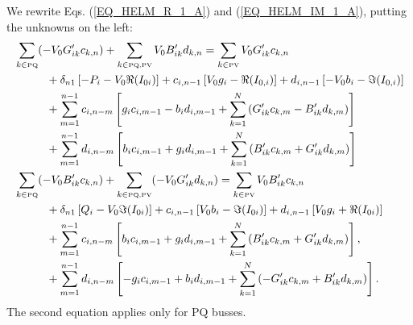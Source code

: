 \documentclass[11pt]{article}
\begin{document}
We rewrite Eqs. (\ref{EQ_HELM_R_1_A}) and (\ref{EQ_HELM_IM_1_A}), putting the unknowns on the left:
\begin{align}
	 &\sum_{k\in\text{\tiny PQ}}(-V_0G'_{ik}c_{k,n}) + \sum_{k\in\text{\tiny PQ,PV}}V_0B'_{ik}d_{k,n} =\sum_{k\in\text{\tiny PV}} V_0G'_{ik}c_{k,n} \notag \\
		&\hspace{1cm}+ \delta_{n1} \left[-P_i - V_0\Re(I_{0i})\right] + c_{i,n-1}\left[V_0g_i - \Re(I_{0,i})\right]+d_{i,n-1}\left[- V_0b_i  - \Im(I_{0,i})\right] \notag \\
		&\hspace{1cm}+ \sum_{m=1}^{n-1}{
			c_{i,n-m}
			\left[
				g_ic_{i,m-1} - b_id_{i,m-1}+ \sum_{k=1}^N\left(G'_{ik}c_{k,m} - B'_{ik}d_{k,m}\right) 
			\right]
		} \notag \\
		&\hspace{1cm}+ \sum_{m=1}^{n-1}{
			d_{i,n-m}
			\left[
				b_ic_{i,m-1} + g_id_{i,m-1} + \sum_{k=1}^N\left(B'_{ik}c_{k,m} + G'_{ik}d_{k,m}\right) 
			\right]
		}
		\label{EQ_HELM_R_1} \\
	 &\sum_{k\in\text{\tiny PQ}}(-V_0B'_{ik}c_{k,n}) + \sum_{k\in\text{\tiny PQ,PV}}(-V_0G'_{ik}d_{k,n}) = \sum_{k\in\text{\tiny PV}}V_0B'_{ik}c_{k,n} \notag \\
		&\hspace{1cm}+\delta_{n1}\left[Q_i - V_0\Im(I_{0i})\right] + c_{i,n-1}\left[V_0 b_i-\Im(I_{0i})\right] + d_{i,n-1}\left[V_0g_i  + \Re(I_{0i})\right]\notag \\
		&\hspace{1cm}+ \sum_{m=1}^{n-1}{
			c_{i,n-m} \left[
				b_ic_{i,m-1} + g_id_{i,m-1}  + \sum_{k=1}^N\left(B'_{ik}c_{k,m} + G'_{ik}d_{k,m}\right) 
			\right],
		} \notag \\
		&\hspace{1cm}+ \sum_{m=1}^{n-1}{
			d_{i,n-m} \left[
				-g_ic_{i,m-1} + b_id_{i,m-1}+ \sum_{k=1}^N\left(-G'_{ik}c_{k,m} + B'_{ik}d_{k,m}\right) 
			\right].
		} 
		\label{EQ_HELM_IM_1}
\end{align}
The second equation applies only for PQ busses.
\end{document}
